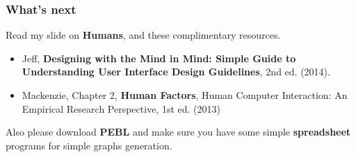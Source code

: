 \documentclass{beamer}
\begin{document}
%	


\begin{frame}
\frametitle{What's next}
Read my slide on \textbf{Humans}, and these complimentary resources.  
	\begin{itemize}
		\item Jeff, \textbf{Designing with the Mind in Mind: Simple Guide to Understanding User Interface Design Guidelines}, 2nd ed. (2014).
		\item Mackenzie, Chapter 2, \textbf{Human Factors},  Human Computer Interaction: An Empirical Research Perspective, 1st ed. (2013) 
	\end{itemize}
Also please download \textbf{PEBL} and make sure you have some simple \textbf{spreadsheet} programs for simple graphs generation.
\end{frame}
\end{document}
